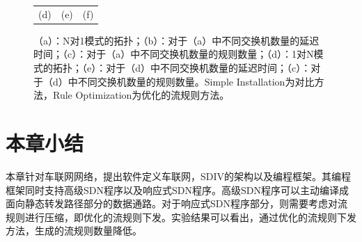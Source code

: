 \begin{figure} [t]
\begin{center}
{\begin{tabular}{ccc}
(d) & (e) & (f)
\end{tabular}
}
\caption{（a）：N对1模式的拓扑；（b）：对于（a）中不同交换机数量的延迟时间；（c）：对于（a）中不同交换机数量的规则数量；（d）：1对N模式的拓扑；（e）：对于（d）中不同交换机数量的延迟时间；（c）：对于（d）中不同交换机数量的规则数量。Simple Installation为对比方法，Rule Optimization为优化的流规则方法。} \label{fig9}
  \end{center}
\end{figure}


\section{本章小结}

本章针对车联网网络，提出软件定义车联网，SDIV的架构以及编程框架。其编程框架同时支持高级SDN程序以及响应式SDN程序。高级SDN程序可以主动编译成面向静态转发路径部分的数据通路。对于响应式SDN程序部分，则需要考虑对流规则进行压缩，即优化的流规则下发。实验结果可以看出，通过优化的流规则下发方法，生成的流规则数量降低。



